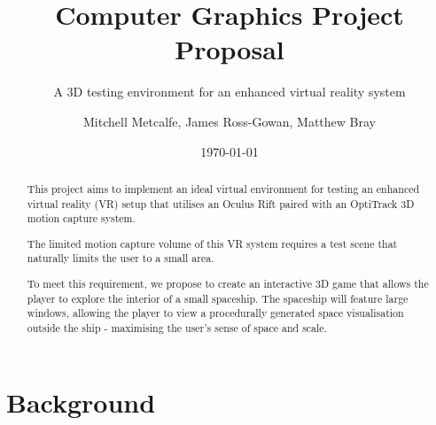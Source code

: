 \documentclass[11pt]{scrartcl} %
\title{Computer Graphics Project Proposal}
\subtitle{A 3D testing environment for an enhanced virtual reality system}
\author{Mitchell Metcalfe, James Ross-Gowan, Matthew Bray }
\date{\today} %
\begin{document}
\maketitle

\begin{abstract}

    This project aims to implement an ideal virtual environment for testing an
    enhanced virtual reality (VR) setup that utilises an Oculus Rift
    paired with an OptiTrack 3D motion capture system.

    The limited motion capture volume of this VR system requires a test scene
    that naturally limits the user to a small area.

    To meet this requirement, we propose to create an interactive 3D game that
    allows the player to explore the interior of a small spaceship. The
    spaceship will feature large windows, allowing the player to view a
    procedurally generated space visualisation outside the ship - maximising
    the user's sense of space and scale.


\end{abstract}







\section*{Background}
\end{document}
